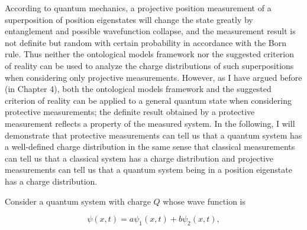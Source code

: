 According to quantum mechanics, a projective position measurement of a superposition of position eigenstates will change the state greatly by entanglement and possible wavefunction collapse, and the measurement result is not definite but random with certain probability in accordance with the Born rule. Thus  neither the ontological models framework nor  the suggested criterion of reality can be used to analyze the charge distributions of such superpositions when considering only projective measurements. 
However, as I have argued before (in Chapter 4), both the ontological models framework and the suggested criterion of reality can be applied to a general quantum state when considering protective measurements; the definite result obtained by a protective measurement reflects a property of the measured system. 
In the following, I will demonstrate that protective measurements can tell us that a quantum system has a well-defined charge distribution in the same sense that classical measurements can tell us that a classical system has a charge distribution and projective measurements can tell us that a quantum system being in a position eigenstate has a charge distribution.

Consider a quantum system with  charge $Q$ whose wave function is

\begin{equation}
\psi(x,t)=a\psi_1(x,t)+b\psi_2(x,t),
\end{equation}

